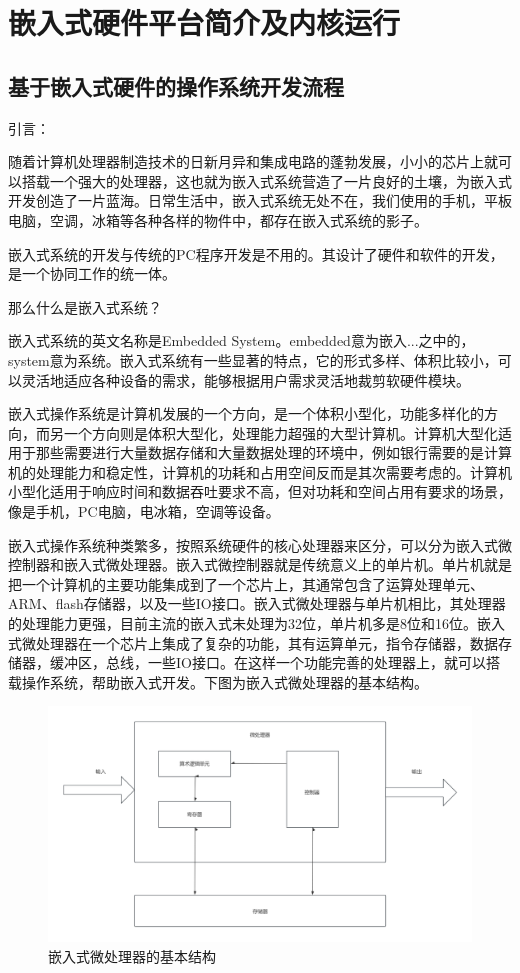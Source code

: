 \chapter{嵌入式硬件平台简介及内核运行}
\section{基于嵌入式硬件的操作系统开发流程}

引言：

随着计算机处理器制造技术的日新月异和集成电路的蓬勃发展，小小的芯片上就可以搭载一个强大的处理器，这也就为嵌入式系统营造了一片良好的土壤，为嵌入式开发创造了一片蓝海。日常生活中，嵌入式系统无处不在，我们使用的手机，平板电脑，空调，冰箱等各种各样的物件中，都存在嵌入式系统的影子。

嵌入式系统的开发与传统的PC程序开发是不用的。其设计了硬件和软件的开发，是一个协同工作的统一体。

那么什么是嵌入式系统？

嵌入式系统的英文名称是Embedded System。embedded意为嵌入...之中的，system意为系统。嵌入式系统有一些显著的特点，它的形式多样、体积比较小，可以灵活地适应各种设备的需求，能够根据用户需求灵活地裁剪软硬件模块。

嵌入式操作系统是计算机发展的一个方向，是一个体积小型化，功能多样化的方向，而另一个方向则是体积大型化，处理能力超强的大型计算机。计算机大型化适用于那些需要进行大量数据存储和大量数据处理的环境中，例如银行需要的是计算机的处理能力和稳定性，计算机的功耗和占用空间反而是其次需要考虑的。计算机小型化适用于响应时间和数据吞吐要求不高，但对功耗和空间占用有要求的场景，像是手机，PC电脑，电冰箱，空调等设备。

嵌入式操作系统种类繁多，按照系统硬件的核心处理器来区分，可以分为嵌入式微控制器和嵌入式微处理器。嵌入式微控制器就是传统意义上的单片机。单片机就是把一个计算机的主要功能集成到了一个芯片上，其通常包含了运算处理单元、ARM、flash存储器，以及一些IO接口。嵌入式微处理器与单片机相比，其处理器的处理能力更强，目前主流的嵌入式未处理为32位，单片机多是8位和16位。嵌入式微处理器在一个芯片上集成了复杂的功能，其有运算单元，指令存储器，数据存储器，缓冲区，总线，一些IO接口。在这样一个功能完善的处理器上，就可以搭载操作系统，帮助嵌入式开发。下图为嵌入式微处理器的基本结构。

\begin{figure}[H]
	\centering
	\includegraphics{figures/08-01-嵌入式微处理器基本结构.png}
	\caption{嵌入式微处理器的基本结构}
\end{figure}

